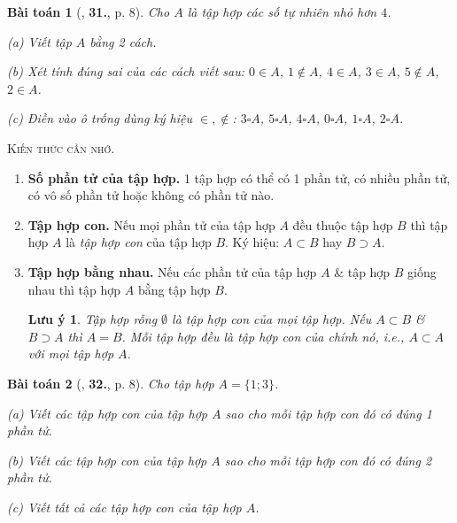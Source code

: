 \documentclass{article}
\numberwithin{equation}{section}
\newtheorem{baitoan}{Bài toán}[section]
\newtheorem{luuy}{Lưu ý}[section]
\begin{document}
\begin{baitoan}[\cite{Trong_Toan_6_2021}, \textbf{31.}, p. 8]
	 Cho $A$ là tập hợp các số tự nhiên nhỏ hơn $4$.
	 \begin{enumerate*}
	 	\item[(a)] Viết tập $A$ bằng 2 cách.
	 	\item[(b)] Xét tính đúng sai của các cách viết sau: $0\in A$, $1\notin A$, $4\in A$, $3\in A$, $5\notin A$, $2\in A$.
	 	\item[(c)] Điền vào ô trống dùng ký hiệu $\in,\notin$: $3\square A$, $5\square A$, $4\square A$, $0\square A$, $1\square A$, $2\square A$.
	 \end{enumerate*}
\end{baitoan}
\noindent\textsc{Kiến thức cần nhớ.}
\begin{tcolorbox}
	\begin{enumerate}
		\item \textbf{Số phần tử của tập hợp.} 1 tập hợp có thể có 1 phần tử, có nhiều phần tử, có vô số phần tử hoặc không có phần tử nào.
		\item \textbf{Tập hợp con.} Nếu mọi phần tử của tập hợp $A$ đều thuộc tập hợp $B$ thì tập hợp $A$ là \textit{tập hợp con} của tập hợp $B$. Ký hiệu: $A\subset B$ hay $B\supset A$.
		\item \textbf{Tập hợp bằng nhau.} Nếu các phần tử của tập hợp $A$ \& tập hợp $B$ giống nhau thì tập hợp $A$ bằng tập hợp $B$.
		
		\begin{luuy}
			Tập hợp rỗng $\emptyset$ là tập hợp con của mọi tập hợp. Nếu $A\subset B$ \& $B\supset A$ thì $A = B$. Mỗi tập hợp đều là tập hợp con của chính nó, i.e., $A\subset A$ với mọi tập hợp $A$.
		\end{luuy}
	\end{enumerate}
\end{tcolorbox}

\begin{baitoan}[\cite{Trong_Toan_6_2021}, \textbf{32.}, p. 8]
	Cho tập hợp $A = \{1;3\}$.
	\begin{enumerate*}
		\item[(a)] Viết các tập hợp con của tập hợp $A$ sao cho mỗi tập hợp con đó có đúng 1 phần tử.
		\item[(b)] Viết các tập hợp con của tập hợp $A$ sao cho mỗi tập hợp con đó có đúng 2 phần tử.
		\item[(c)] Viết tất cả các tập hợp con của tập hợp $A$.
	\end{enumerate*}
\end{baitoan}
\end{document}
